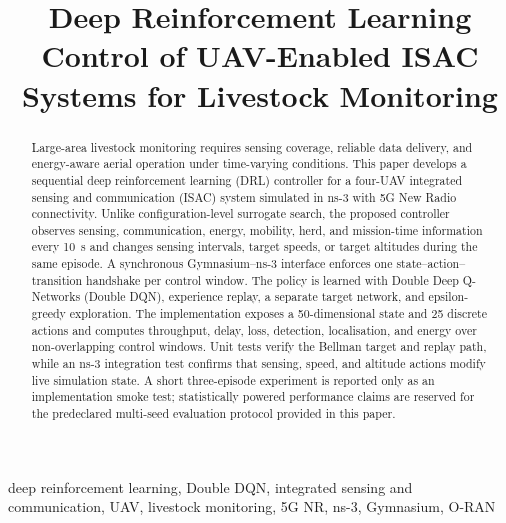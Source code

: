 \documentclass[10pt,conference]{IEEEtran}
\begin{document}
\title{Deep Reinforcement Learning Control of UAV-Enabled ISAC Systems for Livestock Monitoring}

\author{
}

\maketitle

\begin{abstract}
Large-area livestock monitoring requires sensing coverage, reliable data
delivery, and energy-aware aerial operation under time-varying conditions.
This paper develops a sequential deep reinforcement learning (DRL) controller
for a four-UAV integrated sensing and communication (ISAC) system simulated in
ns-3 with 5G New Radio connectivity. Unlike configuration-level surrogate
search, the proposed controller observes sensing, communication, energy,
mobility, herd, and mission-time information every 10~s and changes sensing
intervals, target speeds, or target altitudes during the same episode. A
synchronous Gymnasium--ns-3 interface enforces one state--action--transition
handshake per control window. The policy is learned with Double Deep
Q-Networks (Double DQN), experience replay, a separate target network, and
epsilon-greedy exploration. The implementation exposes a 50-dimensional state
and 25 discrete actions and computes throughput, delay, loss, detection,
localisation, and energy over non-overlapping control windows. Unit tests
verify the Bellman target and replay path, while an ns-3 integration test
confirms that sensing, speed, and altitude actions modify live simulation
state. A short three-episode experiment is reported only as an implementation
smoke test; statistically powered performance claims are reserved for the
predeclared multi-seed evaluation protocol provided in this paper.
\end{abstract}

\begin{IEEEkeywords}
deep reinforcement learning, Double DQN, integrated sensing and communication,
UAV, livestock monitoring, 5G NR, ns-3, Gymnasium, O-RAN
\end{IEEEkeywords}
\end{document}
